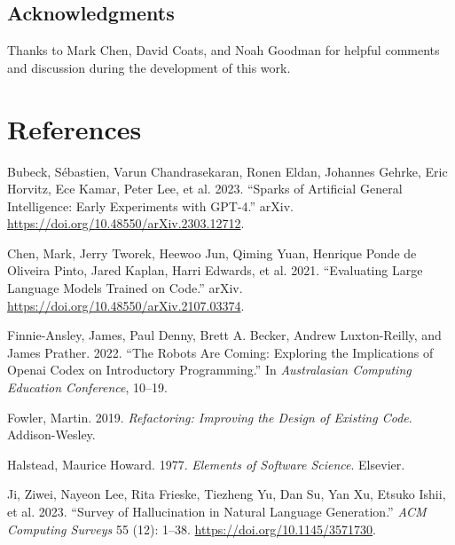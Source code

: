 \documentclass[
]{article}
\newlength{\cslhangindent}
\newlength{\cslentryspacingunit} %
\newenvironment{CSLReferences}[2] %
 {%
  \setlength{\parindent}{0pt}
  \ifodd #1
  \let\oldpar\par
  \def\par{\hangindent=\cslhangindent\oldpar}
  \fi
  \setlength{\parskip}{#2\cslentryspacingunit}
 }%
 {}
\begin{document}
\hypertarget{acknowledgments}{%
\subsection{Acknowledgments}\label{acknowledgments}}

Thanks to Mark Chen, David Coats, and Noah Goodman for helpful comments
and discussion during the development of this work.

\hypertarget{references}{%
\section*{References}\label{references}}

\hypertarget{refs}{}
\begin{CSLReferences}{1}{0}
\leavevmode{}%
Bubeck, Sébastien, Varun Chandrasekaran, Ronen Eldan, Johannes Gehrke,
Eric Horvitz, Ece Kamar, Peter Lee, et al. 2023. {``Sparks of
{Artificial} {General} {Intelligence}: {Early} Experiments with
{GPT}-4.''} arXiv. \url{https://doi.org/10.48550/arXiv.2303.12712}.

\leavevmode{}%
Chen, Mark, Jerry Tworek, Heewoo Jun, Qiming Yuan, Henrique Ponde de
Oliveira Pinto, Jared Kaplan, Harri Edwards, et al. 2021. {``Evaluating
{Large} {Language} {Models} {Trained} on {Code}.''} arXiv.
\url{https://doi.org/10.48550/arXiv.2107.03374}.

\leavevmode{}%
Finnie-Ansley, James, Paul Denny, Brett A. Becker, Andrew Luxton-Reilly,
and James Prather. 2022. {``The Robots Are Coming: {Exploring} the
Implications of Openai Codex on Introductory Programming.''} In
\emph{Australasian {Computing} {Education} {Conference}}, 10--19.

\leavevmode{}%
Fowler, Martin. 2019. \emph{Refactoring: {Improving} the {Design} of
{Existing} {Code}}. Addison-Wesley.

\leavevmode{}%
Halstead, Maurice Howard. 1977. \emph{Elements of {Software} {Science}}.
Elsevier.

\leavevmode{}%
Ji, Ziwei, Nayeon Lee, Rita Frieske, Tiezheng Yu, Dan Su, Yan Xu, Etsuko
Ishii, et al. 2023. {``Survey of {Hallucination} in {Natural} {Language}
{Generation}.''} \emph{ACM Computing Surveys} 55 (12): 1--38.
\url{https://doi.org/10.1145/3571730}.


\end{CSLReferences}
\end{document}
